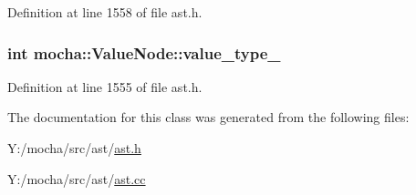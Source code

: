 Definition at line 1558 of file ast.h.

\hypertarget{classmocha_1_1_value_node_ade40c9a57efc8a52d7fea62c8928bae2}{
\subsubsection[{value\_\-type\_\-}]{\setlength{\rightskip}{0pt plus 5cm}int {\bf mocha::ValueNode::value\_\-type\_\-}}}
\label{classmocha_1_1_value_node_ade40c9a57efc8a52d7fea62c8928bae2}


Definition at line 1555 of file ast.h.



The documentation for this class was generated from the following files:\begin{DoxyCompactItemize}
\item 
Y:/mocha/src/ast/\hyperlink{ast_8h}{ast.h}\item 
Y:/mocha/src/ast/\hyperlink{ast_8cc}{ast.cc}\end{DoxyCompactItemize}
